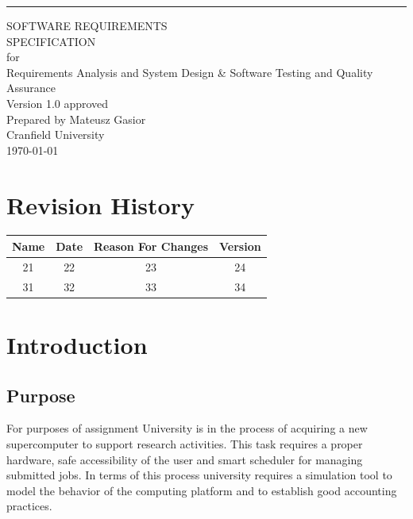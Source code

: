 \documentclass{report}
\date{}
\def\myversion{1.0 }
\begin{document}
\begin{flushright}
    \rule{16cm}{5pt}\vskip1cm
    \begin{bfseries}
        \Huge{SOFTWARE REQUIREMENTS\\ SPECIFICATION}\\
        \vspace{1.9cm}
        for\\
        \vspace{1.9cm}
        Requirements Analysis and System Design 
        \& 
        Software Testing and Quality Assurance \\
        \vspace{1.9cm}
        \LARGE{Version \myversion approved}\\
        \vspace{1.9cm}
        Prepared by Mateusz Gasior\\
        \vspace{1.9cm}
        Cranfield University\\
        \vspace{1.9cm}
        \today\\
    \end{bfseries}
\end{flushright}

\tableofcontents


\chapter*{Revision History}

\begin{center}
    \begin{tabular}{|c|c|c|c|}
        \hline
	    Name & Date & Reason For Changes & Version\\
        \hline
	    21 & 22 & 23 & 24\\
        \hline
	    31 & 32 & 33 & 34\\
        \hline
    \end{tabular}
\end{center}

\chapter{Introduction}

\section{Purpose}
For purposes of assignment University is in the process of acquiring a new supercomputer to support
research activities. This task requires a proper hardware, safe accessibility of the user and smart scheduler
for managing submitted jobs. In terms of this process university requires a simulation tool to model the behavior of the computing platform and to establish good accounting practices. 
\end{document}
